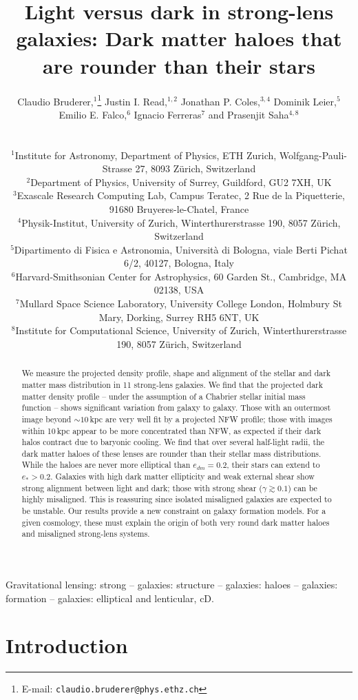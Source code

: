 \documentclass[useAMS,usenatbib]{mn2e}
\title[Light versus dark in strong-lens galaxies]{Light versus dark in strong-lens galaxies: Dark matter haloes that are rounder than their stars}
\author[Bruderer et al.]
{\parbox{\textwidth}{Claudio Bruderer,$^{1}$\thanks{E-mail: \texttt{claudio.bruderer@phys.ethz.ch}}
Justin I. Read,$^{1,2}$
Jonathan P. Coles,$^{3,4}$
Dominik Leier,$^{5}$
Emilio E. Falco,$^{6}$
Ignacio Ferreras$^{7}$ and
Prasenjit Saha$^{4,8}$}\vspace{0.4cm}\\
\parbox{\textwidth}{$^{1}$Institute for Astronomy, Department of Physics, ETH Zurich, Wolfgang-Pauli-Strasse 27, 8093 Z\"urich, Switzerland\\
$^{2}$Department of Physics, University of Surrey, Guildford, GU2 7XH, UK\\
$^{3}$Exascale Research Computing Lab, Campus Teratec, 2 Rue de la Piquetterie, 91680 Bruyeres-le-Chatel, France\\
$^{4}$Physik-Institut, University of Zurich, Winterthurerstrasse 190, 8057 Z\"urich, Switzerland\\
$^{5}$Dipartimento di Fisica e Astronomia, Universit\`{a} di Bologna, viale Berti Pichat 6/2, 40127, Bologna, Italy\\
$^{6}$Harvard-Smithsonian Center for Astrophysics, 60 Garden St., Cambridge, MA 02138, USA\\
$^{7}$Mullard Space Science Laboratory, University College London, Holmbury St Mary, Dorking, Surrey RH5 6NT, UK\\
$^{8}$Institute for Computational Science, University of Zurich, Winterthurerstrasse 190, 8057 Z\"urich, Switzerland}}
\begin{document}
\maketitle

\begin{abstract}
We measure the projected density profile, shape and alignment of the stellar and dark matter mass distribution in 11 strong-lens galaxies. We find that the projected dark matter density profile -- under the assumption of a Chabrier stellar initial mass function -- shows significant variation from galaxy to galaxy. Those with an outermost image beyond $\sim 10$\,kpc are very well fit by a projected NFW profile; those with images within 10\,kpc appear to be more concentrated than NFW, as expected if their dark halos contract due to baryonic cooling. We find that over several half-light radii, the dark matter haloes of these lenses are rounder than their stellar mass distributions. While the haloes are never more elliptical than $e_{dm} = 0.2$, their stars can extend to $e_* > 0.2$. Galaxies with high dark matter ellipticity and weak external shear show strong alignment between light and dark; those with strong shear ($\gamma \gtrsim 0.1$) can be highly misaligned. This is reassuring since isolated misaligned galaxies are expected to be unstable. Our results provide a new constraint on galaxy formation models. For a given cosmology, these must explain the origin of both very round dark matter haloes and misaligned strong-lens systems.
\end{abstract}

\begin{keywords}
Gravitational lensing: strong -- galaxies: structure -- galaxies: haloes -- galaxies: formation -- galaxies: elliptical and lenticular, cD.
\end{keywords}


\section{Introduction}\label{sec:introduction}
\end{document}
